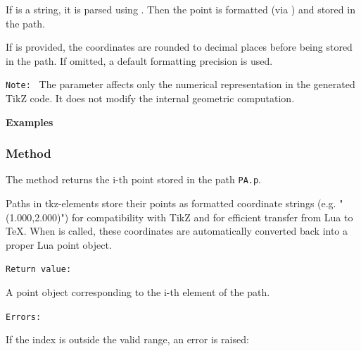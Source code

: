 \medskip

If  is a string, it is parsed using .
Then the point is formatted (via ) and stored
in the path.

\medskip

If  is provided, the coordinates are rounded to 
decimal places before being stored in the path.
If omitted, a default formatting precision is used.

\medskip

\texttt{Note: }
The parameter  affects only the numerical representation in the
generated TikZ code. It does not modify the internal geometric
computation.

\medskip

\textbf{Examples}

\begin{tkzexample}[latex=.35\textwidth]
\end{tkzexample}

\begin{tkzexample}[latex=.35\textwidth]
\end{tkzexample}
\subsubsection{Method }
\label{ssub:method_tkzmeth_path_get}

The method  returns the i-th point stored in the path \texttt{PA.p}.

Paths in tkz-elements store their points as formatted coordinate strings
(e.g. "(1.000,2.000)") for compatibility with TikZ and for efficient
transfer from Lua to \TeX.
When  is called, these coordinates are automatically converted back
into a proper Lua point object.

\medskip
\texttt{Return value: }

A point object corresponding to the i-th element of the path.

\medskip
\texttt{Errors: }

If the index is outside the valid range, an error is raised:



